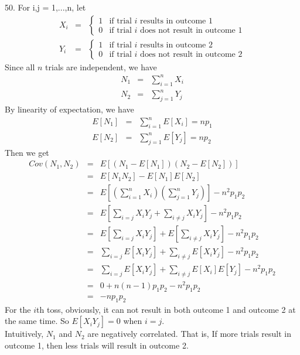 \documentclass[12pt]{article}
\begin{document}
50. For i,j = 1,...,n, let
\begin{eqnarray*}
  X_i &=&
\begin{cases}
  1 & \text {if trial $i$ results in outcome 1} \\
  0 & \text {if trial $i$ does not result in outcome 1}
\end{cases} \\
  Y_i &=&
\begin{cases}
  1 & \text {if trial $i$ results in outcome 2} \\
  0 & \text {if trial $i$ does not result in outcome 2}
\end{cases}
\end{eqnarray*}
Since all $n$ trials are independent, we have
\begin{eqnarray*}
  N_1 &=& \sum_{i=1}^n X_i \\
  N_2 &=& \sum_{j=1}^n Y_j
\end{eqnarray*}
By linearity of expectation, we have
\begin{eqnarray*}
  E[N_1] &=& \sum_{i=1}^n E[X_i] = np_1 \\
  E[N_2] &=& \sum_{j=1}^n E[Y_j] = np_2
\end{eqnarray*}
Then we get
\begin{eqnarray*}
  Cov(N_1, N_2)
  &=& E[(N_1 - E[N_1])(N_2 - E[N_2])] \\
  &=& E[N_1N_2] - E[N_1]E[N_2] \\
  &=& E[(\sum_{i=1}^n X_i)(\sum_{j=1}^n Y_j)] - n^2 p_1p_2 \\
  &=& E[\sum_{i = j} X_iY_j + \sum_{i \neq j} X_iY_j] - n^2 p_1p_2 \\
  &=& E[\sum_{i = j} X_iY_j] + E[\sum_{i \neq j} X_iY_j] - n^2 p_1p_2 \\
  &=& \sum_{i = j} E[X_iY_j] + \sum_{i \neq j} E[X_iY_j] - n^2 p_1p_2 \\
  &=& \sum_{i = j} E[X_iY_j] + \sum_{i \neq j} E[X_i]E[Y_j] - n^2 p_1p_2 \\
  &=& 0 + n(n-1) p_1 p_2 - n^2 p_1 p_2 \\
  &=& - n p_1 p_2
\end{eqnarray*}
For the $i$th toss, obviously, it can not result in both outcome 1 and outcome 2 at the same time. So $E[X_iY_j] = 0$ when $i = j$. \\

Intuitively, $N_1$ and $N_2$ are negatively correlated. That is, If more trials result in outcome 1, then less trials will result in outcome 2. \\
\end{document}
